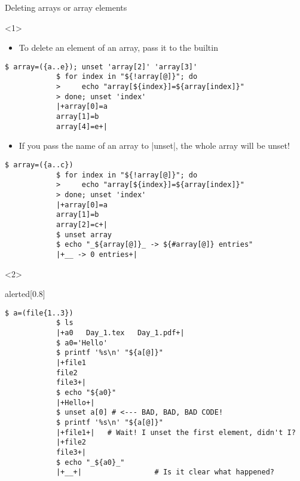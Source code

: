 \begin{frame}[fragile]{Deleting arrays or array elements}
    \vspace{-3mm}
    \begin{onlyenv}<1>
        \begin{itemize}
            \item To delete an element of an array, pass it to the  builtin
        \end{itemize}
        \begin{lstlisting}[style=MyBash, belowskip=-5mm]
            $ array=({a..e}); unset 'array[2]' 'array[3]'
            $ for index in "${!array[@]}"; do
            >     echo "array[${index}]=${array[index]}"
            > done; unset 'index'
            |+array[0]=a
            array[1]=b
            array[4]=e+|
        \end{lstlisting}
        \begin{itemize}
            \item If you pass the name of an array to \bash|unset|, the whole array will be unset!
        \end{itemize}
        \begin{lstlisting}[style=MyBash]
            $ array=({a..c})
            $ for index in "${!array[@]}"; do
            >     echo "array[${index}]=${array[index]}"
            > done; unset 'index'
            |+array[0]=a
            array[1]=b
            array[2]=c+|
            $ unset array
            $ echo "_${array[@]}_ -> ${#array[@]} entries"
            |+__ -> 0 entries+|
        \end{lstlisting}
    \end{onlyenv}
    \begin{onlyenv}<2>
        \begin{varblock}{alerted}[0.8\textwidth]{}
            \large {}
        \end{varblock}
        \begin{lstlisting}[style=MyBash, emph={[7]a, a0}]
            $ a=(file{1..3})
            $ ls
            |+a0   Day_1.tex   Day_1.pdf+|
            $ a0='Hello'
            $ printf '%s\n' "${a[@]}"
            |+file1
            file2
            file3+|
            $ echo "${a0}"
            |+Hello+|
            $ unset a[0] # <--- BAD, BAD, BAD CODE!
            $ printf '%s\n' "${a[@]}"
            |+file1+|   # Wait! I unset the first element, didn't I?
            |+file2
            file3+|
            $ echo "_${a0}_"
            |+__+|                 # Is it clear what happened?
        \end{lstlisting}
    \end{onlyenv}
\end{frame}
